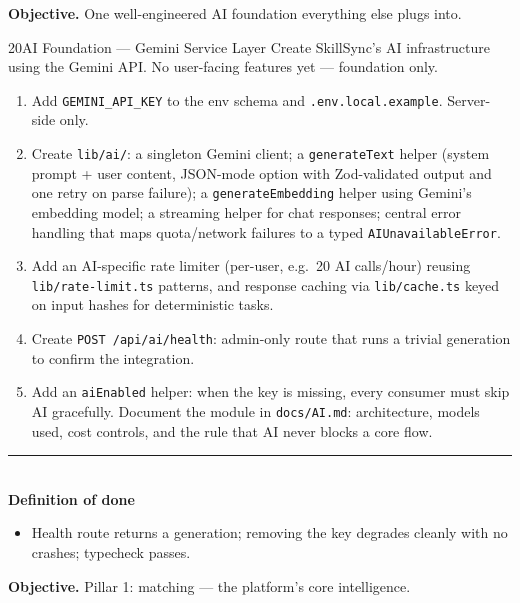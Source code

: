 \documentclass[11pt,a4paper]{article}
\newcommand{\dod}{\medskip\noindent\textcolor{donegreen}{\rule{\linewidth}{0.5pt}}\\[1mm]\textbf{\textcolor{donegreen}{Definition of done}}\\[-2mm]}
\newcommand{\objective}[1]{\noindent\textbf{Objective.} #1\medskip}
\newcommand{\filepath}[1]{\texttt{#1}}
\begin{document}
\objective{One well-engineered AI foundation everything else plugs into.}

\begin{promptbox}{20}{AI Foundation --- Gemini Service Layer}
Create SkillSync's AI infrastructure using the Gemini API. No user-facing features
yet --- foundation only.

\begin{enumerate}[leftmargin=1.6em]
  \item Add \texttt{GEMINI\_API\_KEY} to the env schema and
        \filepath{.env.local.example}. Server-side only.
  \item Create \filepath{lib/ai/}: a singleton Gemini client; a
        \texttt{generateText} helper (system prompt + user content, JSON-mode option
        with Zod-validated output and one retry on parse failure); a
        \texttt{generateEmbedding} helper using Gemini's embedding model; a
        streaming helper for chat responses; central error handling that maps
        quota/network failures to a typed \texttt{AIUnavailableError}.
  \item Add an AI-specific rate limiter (per-user, e.g.\ 20 AI calls/hour) reusing
        \filepath{lib/rate-limit.ts} patterns, and response caching via
        \filepath{lib/cache.ts} keyed on input hashes for deterministic tasks.
  \item Create \texttt{POST /api/ai/health}: admin-only route that runs a trivial
        generation to confirm the integration.
  \item Add an \texttt{aiEnabled} helper: when the key is missing, every consumer
        must skip AI gracefully. Document the module in
        \filepath{docs/AI.md}: architecture, models used, cost controls, and the
        rule that AI never blocks a core flow.
\end{enumerate}

\dod
\begin{itemize}[leftmargin=1.6em]
  \item Health route returns a generation; removing the key degrades cleanly with no
        crashes; typecheck passes.
\end{itemize}
\end{promptbox}

\objective{Pillar 1: matching --- the platform's core intelligence.}
\end{document}
